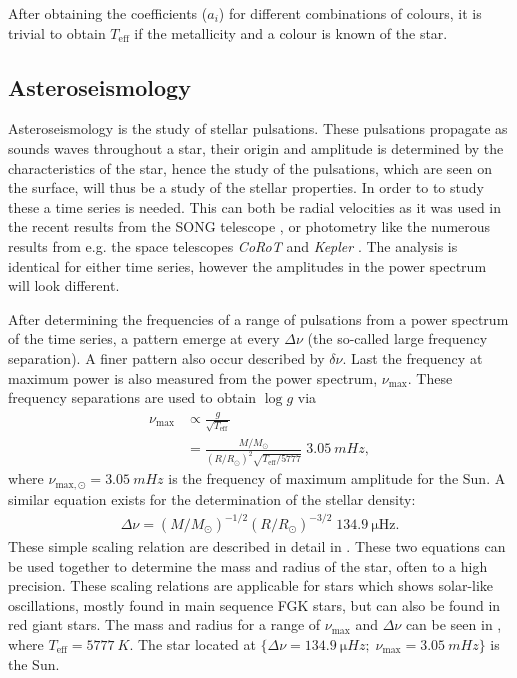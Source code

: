 After obtaining the coefficients ($a_i$) for different combinations of colours,
it is trivial to obtain $T_\mathrm{eff}$ if the metallicity and a colour is
known of the star.

\subsection{Asteroseismology}

Asteroseismology is the study of stellar pulsations. These pulsations propagate
as sounds waves throughout a star, their origin and amplitude is determined by
the characteristics of the star, hence the study of the pulsations, which are
seen on the surface, will thus be a study of the stellar properties. In order to
to study these a time series is needed. This can both be radial velocities as it
was used in the recent results from the SONG telescope \citep{Grundahl2017}, or
photometry like the numerous results from e.g. the space telescopes \emph{CoRoT}
and \emph{Kepler}
\citep[see e.g.][]{Christensen-Dalsgaard2010,Huber2014,Chaplin2011}. The
analysis is identical for either time series, however the amplitudes in the
power spectrum will look different.

After determining the frequencies of a range of pulsations from a power spectrum
of the time series, a pattern emerge at every $\Delta\nu$ (the so-called large
frequency separation). A finer pattern also occur described by $\delta\nu$. Last
the frequency at maximum power is also measured from the power spectrum,
$\nu_\mathrm{max}$. These frequency separations are used to obtain $\log g$ via
\begin{align}
  \nu_\mathrm{max} &\propto \frac{g}{\sqrt{T_\mathrm{eff}}} \\
                   &= \frac{M/M_\odot}{(R/R_\odot)^2 \sqrt{T_\mathrm{eff}/5777}}\; \SI{3.05}{mHz},\label{eq:scaling1}
\end{align}
where $\nu_{\mathrm{max},\odot}=\SI{3.05}{mHz}$ is the frequency of maximum
amplitude for the Sun. A similar equation exists for the determination of the
stellar density:
\begin{align}
  \Delta\nu = (M/M_\odot)^{-1/2} (R/R_\odot)^{-3/2}\; \SI{134.9}{\micro\hertz}.
\end{align}
These simple scaling relation are described in detail in \citet{Kjeldsen1995}.
These two equations can be used together to determine the mass and radius of the
star, often to a high precision. These scaling relations are applicable for
stars which shows solar-like oscillations, mostly found in main sequence FGK
stars, but can also be found in red giant stars. The mass and radius for a range
of $\nu_\mathrm{max}$ and $\Delta\nu$ can be seen in , where
$T_\mathrm{eff}=\SI{5777}{K}$. The star located at
$\{\Delta\nu=\SI{134.9}{\micro Hz};\;\nu_\mathrm{max}=\SI{3.05}{mHz}\}$ is the
Sun.


